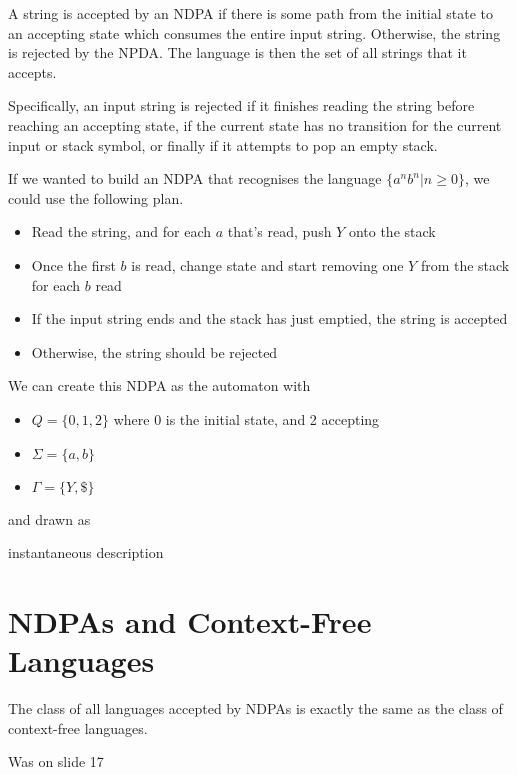 A string is accepted by an NDPA if there is some path from the initial state to an accepting state which consumes the
 entire input string. Otherwise, the string is rejected by the NPDA. The language is then the set of all strings that
 it accepts.

Specifically, an input string is rejected if it finishes reading the string before reaching an accepting state, if the
 current state has no transition for the current input or stack symbol, or finally if it attempts to pop an empty stack.

\begin{example*}{}{}
  If we wanted to build an NDPA that recognises the language $\{a^n b^n | n \geq 0\}$, we could use the following plan.
  \begin{itemize}
    \item Read the string, and for each $a$ that's read, push $Y$ onto the stack
    \item Once the first $b$ is read, change state and start removing one $Y$ from the stack for each $b$ read
    \item If the input string ends and the stack has just emptied, the string is accepted
    \item Otherwise, the string should be rejected
  \end{itemize}

  We can create this NDPA as the automaton with
  \begin{itemize}
    \item $Q = \{0, 1, 2\}$ where 0 is the initial state, and 2 accepting
    \item $\Sigma = \{a, b\}$
    \item $\Gamma = \{Y, \$\}$
  \end{itemize}
  and drawn as
  \begin{center}
  \end{center}
\end{example*}

{\Huge instantaneous description}

\section*{NDPAs and Context-Free Languages}

The class of all languages accepted by NDPAs is exactly the same as the class of context-free languages.

{\Huge Was on slide 17}